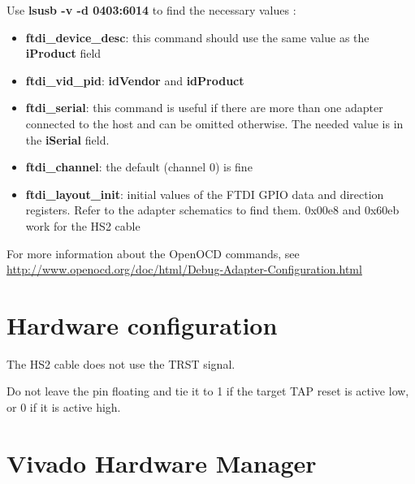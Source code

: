 \documentclass{article}
\begin{document}
    Use \textbf{lsusb -v -d 0403:6014} to find the necessary values :
    
    \vspace{-\topsep}
	\begin{itemize}
	\item \textbf{ftdi\_device\_desc}: this command should use the same value as the \textbf{iProduct} field
	
	\item \textbf{ftdi\_vid\_pid}: \textbf{idVendor} and \textbf{idProduct}
	
	\item \textbf{ftdi\_serial}: this command is useful if there are more than one adapter connected to the host and can be omitted otherwise. The needed value is in the \textbf{iSerial} field.
	
	\item \textbf{ftdi\_channel}: the default (channel 0) is fine
	
	\item \textbf{ftdi\_layout\_init}: initial values of the FTDI GPIO data and direction registers. Refer to the adapter schematics to find them. 0x00e8 and 0x60eb work for the HS2 cable
	\end{itemize}
	
	For more information about the OpenOCD commands, see \url{http://www.openocd.org/doc/html/Debug-Adapter-Configuration.html}
	
	\section{Hardware configuration}
	
	The HS2 cable does not use the TRST signal. 
	
	Do not leave the pin floating and tie it to 1 if the target TAP reset is active low, or 0 if it is active high.
	
	\section{Vivado Hardware Manager}
	
	
	
\end{document}
